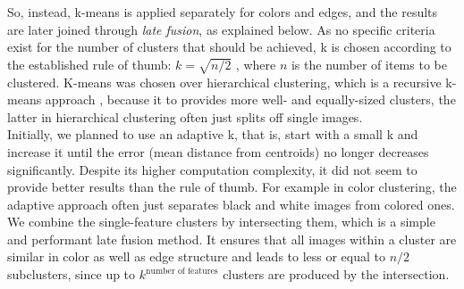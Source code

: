 \bigskip
So, instead, k-means is applied separately for colors and edges, and the results are later joined through \emph{late fusion}, as explained below. As no specific criteria exist for the number of clusters that should be achieved, k is chosen according to the established rule of thumb: $ k = \sqrt{n/2} $ \cite[p.365]{mardia1979}, where $n$ is the number of items to be clustered. K-means was chosen over hierarchical clustering, which is a recursive k-means approach \cite[p.17-20]{de2005hierarchical}, because it to provides more well- and equally-sized clusters, the latter in hierarchical clustering often just splits off single images.\\
Initially, we planned to use an adaptive k, that is, start with a small k and increase it until the error (mean distance from centroids) no longer decreases significantly. Despite its higher computation complexity, it did not seem to provide better results than the rule of thumb. For example in color clustering, the adaptive approach often just separates black and white images from colored ones.\\
We combine the single-feature clusters by intersecting them, which is a simple and performant late fusion method. It ensures that all images within a cluster are similar in color as well as edge structure and leads to less or equal to $ n/2 $ subclusters, since up to $k^ \text{number of features}$ clusters are produced by the intersection.
